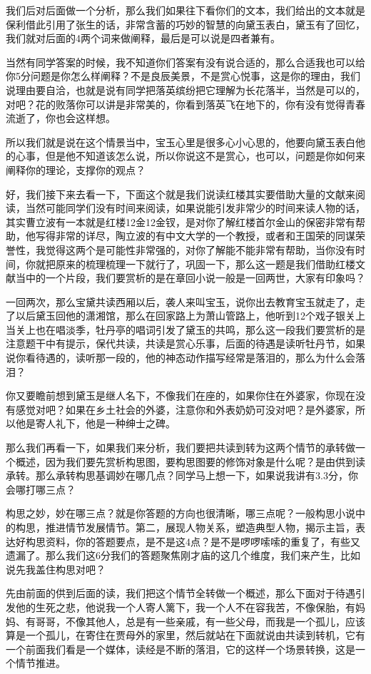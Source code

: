 \documentclass{ctexart}
\renewcommand{\\}{\par}
\begin{document}
我们后对后面做一个分析，那么我们如果往下看你们的文本，我们给出的文本就是保利借此引用了张生的话，非常含蓄的巧妙的智慧的向黛玉表白，黛玉有了回忆，我们就对后面的4两个词来做阐释，最后是可以说是四者兼有。

当然有同学答案的时候，我不知道你们答案有没有说合适的，那么合适我也可以给你5分问题是你怎么样阐释？不是良辰美景，不是赏心悦事，这是你的理由，我们说理由要自洽，也就是说有同学把落英缤纷把它理解为长花落半，当然是可以的，对吧？花的败落你可以讲是非常美的，你看到落英飞在地下的，你有没有觉得青春流逝了，你也会这样想。

所以我们就是说在这个情景当中，宝玉心里是很多心小心思的，他要向黛玉表白他的心事，但是他不知道该怎么说，所以你说这不是赏心，也可以，问题是你如何来阐释你的理论，支撑你的观点？

好，我们接下来去看一下，下面这个就是我们说读红楼其实要借助大量的文献来阅读，当然可能同学们没有时间来阅读，如果说能引发非常少的时间来读人物的话，其实曹立波有一本就是红楼12金12金钗，是对你了解红楼首尔金山的保密非常有帮助，他写得非常的详尽，陶立波的有中文大学的一个教授，或者和王国荣的同谋荣誉性，我觉得这两个是可能性非常强的，对你了解能不能非常有帮助，当你没有时间，你就把原来的梳理梳理一下就行了，巩固一下，那么这一题是我们借助红楼文献当中的一个片段，我们要赏析的是在章回小说一般是一回两世，大家有印象吗？

一回两次，那么宝黛共读西厢以后，袭人来叫宝玉，说你出去教育宝玉就走了，走了以后黛玉回他的潇湘馆，那么在回家路上为萧山管路上，他听到12个戏子银关上当关上也在唱淡季，牡丹亭的唱词引发了黛玉的共鸣，那么这一段我们要赏析的是注意题干中有提示，保代共读，共读是赏心乐事，后面的待遇是读听牡丹节，如果说你看待遇的，读听那一段的，他的神态动作描写经常是落泪的，那么为什么会落泪？

你又要瞻前想到黛玉是继人名下，不像我们在座的，如果你住在外婆家，你现在没有感觉对吧？如果在乡土社会的外婆，注意你和外表奶奶可没对吧？是外婆家，所以他是寄人礼下，他是一种绅士之碑。

那么我们再看一下，如果我们来分析，我们要把共读到转为这两个情节的承转做一个概述，因为我们要先赏析构思图，要构思图要的修饰对象是什么呢？是由供到读承转。那么承转构思基调妙在哪几点？同学马上想一下，如果说我讲有3.3分，你会哪打哪三点？

构思之妙，妙在哪三点？就是你答题的方向也很清晰，哪三点呢？一般构思小说中的构思，推进情节发展情节。第二，展现人物关系，塑造典型人物，揭示主旨，表达好构思资料，你的答题要点，是不是这4点？是不是啰啰嗦嗦的重复了，有些又遗漏了。那么我们这6分我们的答题聚焦刚才庙的这几个维度，我们来产生，比如说先我盖住构思对吧？

先由前面的供到后面的读，我们把这个情节全转做一个概述，那么下面对于待遇引发他的生死之悲，他说我一个人寄人篱下，我一个人不在容我苦，不像保胎，有妈妈、有哥哥，不像其他人，总是有一些亲戚，有一些父母，而我是一个孤儿，应该算是一个孤儿，在寄住在贾母外的家里，然后就站在下面就说由共读到转机，它有一个前面我们看是一个媒体，读经是不断的落泪，它的这样一个场景转换，这是一个情节推进。
\end{document}
